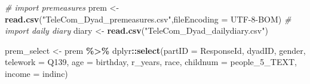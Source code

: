 \documentclass[
]{article}
\newenvironment{Shaded}{\begin{snugshade}}{\end{snugshade}}
\newcommand{\CommentTok}[1]{\textcolor[rgb]{0.56,0.35,0.01}{\textit{#1}}}
\newcommand{\DataTypeTok}[1]{\textcolor[rgb]{0.13,0.29,0.53}{#1}}
\newcommand{\DecValTok}[1]{\textcolor[rgb]{0.00,0.00,0.81}{#1}}
\newcommand{\KeywordTok}[1]{\textcolor[rgb]{0.13,0.29,0.53}{\textbf{#1}}}
\newcommand{\NormalTok}[1]{#1}
\newcommand{\OperatorTok}[1]{\textcolor[rgb]{0.81,0.36,0.00}{\textbf{#1}}}
\newcommand{\StringTok}[1]{\textcolor[rgb]{0.31,0.60,0.02}{#1}}
\begin{document}
\begin{table}[ ht ]
\begin{tabular}{ l c c c }
\end{tabular}
\end{table}

\begin{Shaded}
\begin{Highlighting}[]
\CommentTok{\# import premeasures}
\NormalTok{prem \textless{}{-}}\StringTok{ }\KeywordTok{read.csv}\NormalTok{(}\StringTok{"TeleCom\_Dyad\_premeasures.csv"}\NormalTok{,}\DataTypeTok{fileEncoding =} \StringTok{\textquotesingle{}UTF{-}8{-}BOM\textquotesingle{}}\NormalTok{)}
\CommentTok{\# import daily diary}
\NormalTok{diary \textless{}{-}}\StringTok{ }\KeywordTok{read.csv}\NormalTok{(}\StringTok{"TeleCom\_Dyad\_dailydiary.csv"}\NormalTok{)}
\end{Highlighting}
\end{Shaded}

\begin{Shaded}
\end{Shaded}

\begin{Shaded}
\begin{Highlighting}[]
\NormalTok{prem\_select \textless{}{-}}\StringTok{ }\NormalTok{prem }\OperatorTok{\%\textgreater{}\%}
\StringTok{  }\NormalTok{dplyr}\OperatorTok{::}\KeywordTok{select}\NormalTok{(}\DataTypeTok{partID =}\NormalTok{ ResponseId, dyadID, gender, }\DataTypeTok{telework =}\NormalTok{ Q139, }\DataTypeTok{age =}\NormalTok{ birthday, r\_years, race, }\DataTypeTok{childnum =}\NormalTok{ people\_}\DecValTok{5}\NormalTok{\_TEXT, }\DataTypeTok{income =}\NormalTok{ indinc)}
\end{Highlighting}
\end{Shaded}
\end{document}
